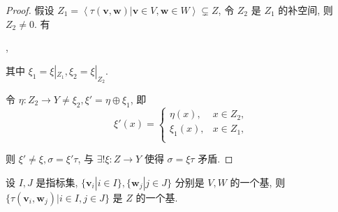 \documentclass[color=black,device=normal,lang=cn,mode=geye]{elegantnote}
\begin{document}
\begin{proof}
    假设 $Z_1=\left<\tau(\boldsymbol{v},\boldsymbol{w})|\boldsymbol{v}\in V,\boldsymbol{w}\in W\right>\subsetneq Z$, 令 $Z_2$ 是 $Z_1$ 的补空间, 则 $Z_2\neq0$. 有
    \begin{center}
        ,
    \end{center}

    其中 $\xi_1=\xi|_{Z_1},\xi_2=\xi|_{Z_2}$.
    
    令 $\eta:Z_2\to Y\neq\xi_2,\xi'=\eta\oplus\xi_1$, 即
    \[\xi'(x)=\begin{cases}
        \eta(x), & x\in Z_2, \\
        \xi_1(x), & x\in Z_1, \\
    \end{cases}\]

    则 $\xi'\neq\xi,\sigma=\xi'\tau$, 与 $\exists!\xi:Z\to Y$ 使得 $\sigma=\xi\tau$ 矛盾.
\end{proof}
\begin{theorem}\label{t1.8}
    设 $I,J$ 是指标集, $\{\boldsymbol{v}_i|i\in I\},\{\boldsymbol{w}_j|j\in J\}$ 分别是 $V,W$ 的一个基, 则 $\{\tau(\boldsymbol{v}_i,\boldsymbol{w}_j)|i\in I,j\in J\}$ 是 $Z$ 的一个基.
\end{theorem}
\end{document}
